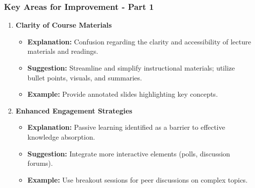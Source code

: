 \documentclass[aspectratio=169]{beamer}
\begin{document}
\begin{frame}[fragile]
    \frametitle{Key Areas for Improvement - Part 1}
    
    \begin{enumerate}
        \item \textbf{Clarity of Course Materials}
        \begin{itemize}
            \item \textbf{Explanation:} Confusion regarding the clarity and accessibility of lecture materials and readings.
            \item \textbf{Suggestion:} Streamline and simplify instructional materials; utilize bullet points, visuals, and summaries.
            \item \textbf{Example:} Provide annotated slides highlighting key concepts.
        \end{itemize}
        
        \item \textbf{Enhanced Engagement Strategies}
        \begin{itemize}
            \item \textbf{Explanation:} Passive learning identified as a barrier to effective knowledge absorption.
            \item \textbf{Suggestion:} Integrate more interactive elements (polls, discussion forums).
            \item \textbf{Example:} Use breakout sessions for peer discussions on complex topics.
        \end{itemize}
    \end{enumerate}
\end{frame}
\end{document}
